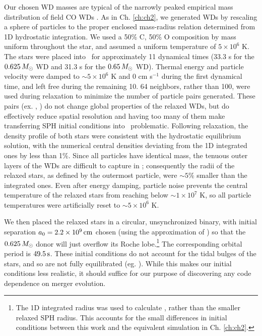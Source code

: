 Our chosen WD masses are typical of the narrowly peaked empirical mass distribution of field CO WDs \citep{tremb09, klei+13}.  As in Ch. \ref{ch:ch2}, we generated WDs by rescaling a sphere of particles to the proper enclosed mass-radius relation determined from 1D hydrostatic integration.  We used a 50\% C, 50\% O composition by mass uniform throughout the star, and assumed a uniform temperature of $5\times 10^6$ K.  The stars were placed into \gasoline\ for approximately 11 dynamical times (33.3 s for the $0.625\,\Msun$ WD and 31.3 s for the $0.65\,\Msun$ WD).  Thermal energy and particle velocity were damped to $\sim 5 \times 10^6$ K and 0 cm s$^{-1}$ during the first dynamical time, and left free during the remaining 10.  64 neighbors, rather than 100, were used during relaxation to minimize the number of particle pairs generated.  These pairs (ex. \citealt{dehna12}, \citealt{spri10rev}) do not change global properties of the relaxed WDs, but do effectively reduce spatial resolution and having too many of them make transferring SPH initial conditions into \arepo\ problematic.  Following relaxation, the density profile of both stars were consistent with the hydrostatic equilibrium solution, with the numerical central densities deviating from the 1D integrated ones by less than 1\%.  Since all particles have identical mass, the tenuous outer layers of the WDs are difficult to capture in \gasoline; consequently the radii of the relaxed stars, as defined by the outermost particle, were $\sim 5$\% smaller than the integrated ones.  Even after energy damping, particle noise prevents the central temperature of the relaxed stars from reaching below $\sim 1\times 10^7$ K, so all particle temperatures were artificially reset to $\sim 5 \times 10^6$ K.

We then placed the relaxed stars in a circular, unsynchronized binary, with initial separation $\azero = 2.2\times10^9\,\mrm{cm}$ chosen (using the approximation of \citealt{eggl83}) so that the $0.625\,\Msun$ donor will just overflow its Roche lobe.\footnote{The 1D integrated radius was used to calculate \azero, rather than the smaller relaxed SPH radius.  This accounts for the small differences in initial conditions between this work and the equivalent simulation in Ch. \ref{ch:ch2}.}  The corresponding orbital period is $49.5\,\mathrm{s}$.  These initial conditions do not account for the tidal bulges of the stars, and so are not fully equilibrated (eg. \citealt{dan+11}).  While this makes our initial conditions less realistic, it should suffice for our purpose of discovering any code dependence on merger evolution.

